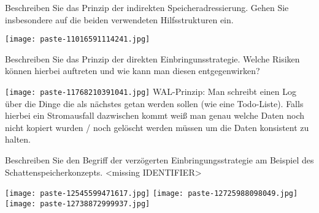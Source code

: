 \documentclass{article}
\begin{document}
\begin{tcolorbox}[colback=white!10!white,colframe=lightgray!75!black,
  savelowerto=\jobname_ex.tex]

\begin{center}
 Beschreiben Sie das Prinzip der 
indirekten
Speicheradressierung. Gehen Sie insbesondere auf die beiden verwendeten Hilfsstrukturen ein. 

\end{center}

\tcblower

\justifying
\texttt{[image: paste-11016591114241.jpg]}

\end{tcolorbox}
\begin{tcolorbox}[colback=white!10!white,colframe=lightgray!75!black,
  savelowerto=\jobname_ex.tex]

\begin{center}
 Beschreiben Sie das Prinzip der 
direkten
Einbringunsstrategie.
Welche Risiken können hierbei auftreten und wie kann man diesen entgegenwirken? 

\end{center}

\tcblower

\justifying
\texttt{[image: paste-11768210391041.jpg]}
WAL-Prinzip: Man schreibt einen Log über die Dinge die als nächstes getan werden sollen (wie eine Todo-Liste). Falls hierbei ein Stromausfall dazwischen kommt weiß man genau welche Daten noch nicht kopiert wurden / noch gelöscht werden müssen um die Daten konsistent zu halten.

\end{tcolorbox}
\begin{tcolorbox}[colback=white!10!white,colframe=lightgray!75!black,
  savelowerto=\jobname_ex.tex]

\begin{center}
 Beschreiben Sie den Begriff der
verzögerten Einbringungsstrategie
am Beispiel des 
Schattenspeicherkonzepts.
 <missing IDENTIFIER>

\end{center}

\tcblower

\justifying
\texttt{[image: paste-12545599471617.jpg]}
\texttt{[image: paste-12725988098049.jpg]}
\texttt{[image: paste-12738872999937.jpg]}

\end{tcolorbox}
\end{document}
